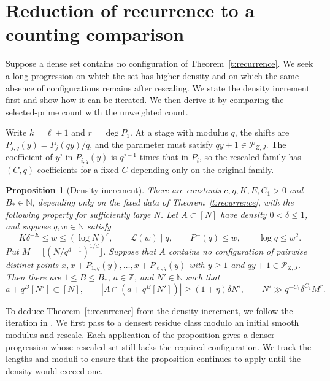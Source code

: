 \documentclass[12pt]{amsart}
\newcommand{\1}{\mathbf 1}
\newtheorem{proposition}[theorem]{Proposition}
\theoremstyle{definition}
\begin{document}
\section{Reduction of recurrence to a counting comparison}\label{s:recurrence}

Suppose a dense set contains no configuration of
Theorem~\ref{t:recurrence}. We seek a long progression on which the
set has higher density and on which the same absence of configurations
remains after rescaling. We state the density increment first and
show how it can be iterated. We then derive it by comparing the
selected-prime count with the unweighted count.

Write \(k=\ell+1\) and \(r=\deg P_1\). At a stage with modulus \(q\),
the shifts are \(P_{j,q}(y)=P_j(qy)/q\), and the parameter must satisfy
\(qy+1\in\mathcal P_{Z,J}\). The coefficient of $y^j$ in $P_{i,q}(y)$ is $q^{j-1}$
times that in $P_i$, so the rescaled family has $(C,q)$-coefficients
for a fixed $C$ depending only on the original family.

\begin{proposition}[Density increment]\label{p:selected-density-increment}
There are constants \(c,\eta,K,E,C_1>0\) and \(B_*\in\mathbb N\),
depending only on the fixed data of Theorem~\ref{t:recurrence}, with the
following property for sufficiently large \(N\). Let \(A\subset[N]\)
have density \(0<\delta\le1\), and suppose \(q,w\in\mathbb N\) satisfy
\begin{equation}\label{e:increment-hypotheses}
 K\delta^{-E}\le w\le(\log N)^c,\qquad
 \mathcal L(w)\mid q,\qquad P^+(q)\le w,\qquad \log q\le w^2.
\end{equation}
Put \(M=\lfloor(N/q^{d-1})^{1/d}\rfloor\). Suppose that \(A\) contains
no configuration of pairwise distinct points
\(x,x+P_{1,q}(y),\ldots,x+P_{\ell,q}(y)\) with
\(y\ge1\) and \(qy+1\in\mathcal P_{Z,J}\).
Then there are \(1\le B\le B_*\), \(a\in\mathbb Z\), and \(N'\in\mathbb N\)
such that
\begin{equation}\label{e:increment-output}
 a+q^B[N']\subset[N],\qquad
 |A\cap(a+q^B[N'])|\ge(1+\eta)\delta N',\qquad
 N'\gg q^{-C_1}\delta^{C_1}M^r.
\end{equation}
\end{proposition}

To deduce Theorem~\ref{t:recurrence} from the density increment, we
follow the iteration in \cite[Section~5, proof of Theorem~1.2]{KMTT}.
We first pass to a densest residue class modulo an initial smooth
modulus and rescale. Each application of the proposition gives a
denser progression whose rescaled set still lacks the required
configuration. We track the lengths and moduli to ensure that the
proposition continues to apply until the density would exceed one.
\end{document}

